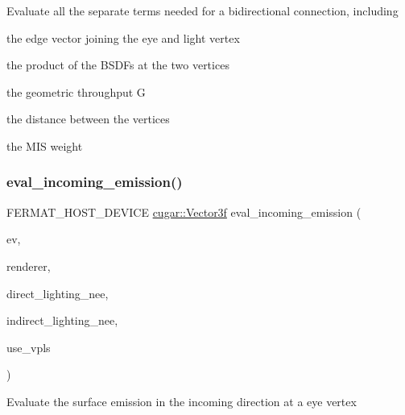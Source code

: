 \begin{DoxyParagraph}{}
Evaluate all the separate terms needed for a bidirectional connection, including ~\newline

\begin{DoxyItemize}
\item the edge vector joining the eye and light vertex
\item the product of the B\+S\+D\+Fs at the two vertices
\item the geometric throughput G
\item the distance between the vertices
\item the M\+IS weight 
\end{DoxyItemize}
\end{DoxyParagraph}
\mbox{\label{group___b_p_t_lib_core_ga73b14b0e545498e4ad796b4776c20836}} 
\subsubsection{\texorpdfstring{eval\+\_\+incoming\+\_\+emission()}{eval\_incoming\_emission()}}
{\footnotesize\ttfamily F\+E\+R\+M\+A\+T\+\_\+\+H\+O\+S\+T\+\_\+\+D\+E\+V\+I\+CE \hyperlink{structcugar_1_1_vector}{cugar\+::\+Vector3f} eval\+\_\+incoming\+\_\+emission (\begin{DoxyParamCaption}\item[{const \hyperlink{struct_eye_vertex}{Eye\+Vertex} \&}]{ev,  }\item[{const \hyperlink{struct_rendering_context_view}{Rendering\+Context\+View} \&}]{renderer,  }\item[{bool}]{direct\+\_\+lighting\+\_\+nee,  }\item[{bool}]{indirect\+\_\+lighting\+\_\+nee,  }\item[{bool}]{use\+\_\+vpls }\end{DoxyParamCaption})\hspace{0.3cm}{\ttfamily [inline]}}

\begin{DoxyParagraph}{}
Evaluate the surface emission in the incoming direction at a eye vertex 
\end{DoxyParagraph}
\mbox{\label{group___b_p_t_lib_core_gad13a8364b017ae28c4732ffd7eab9a65}} 

